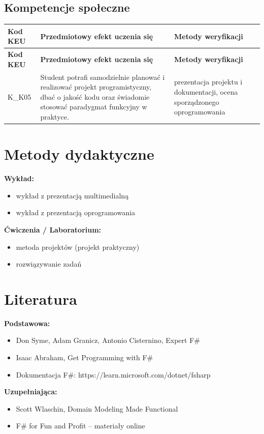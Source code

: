 \documentclass[12pt, a4paper]{article}
\newcommand{\thdrule}{\noalign{\global\setlength{\extrarowheight}{0pt}}}
\newcommand{\thdend}{\noalign{\global\setlength{\extrarowheight}{3pt}}}
\begin{document}
\subsection*{Kompetencje społeczne}
{\scriptsize
\begin{longtable}{m{1.6cm}m{9.0cm}m{4.2cm}}
\thdrule\toprule
\rowcolor{pjatkRed} {\color{white}\footnotesize\textbf{\vphantom{Ag}Kod KEU}} & {\color{white}\footnotesize\textbf{\vphantom{Ag}Przedmiotowy efekt uczenia się}} & {\color{white}\footnotesize\textbf{\vphantom{Ag}Metody weryfikacji}} \\
\midrule\thdend
\endfirsthead
\thdrule\toprule
\rowcolor{pjatkRed} {\color{white}\footnotesize\textbf{\vphantom{Ag}Kod KEU}} & {\color{white}\footnotesize\textbf{\vphantom{Ag}Przedmiotowy efekt uczenia się}} & {\color{white}\footnotesize\textbf{\vphantom{Ag}Metody weryfikacji}} \\
\midrule\thdend
\endhead
  \rowcolor{tableRowLight} K\_K05 & Student potrafi samodzielnie planować i realizować projekt programistyczny, dbać o jakość kodu oraz świadomie stosować paradygmat funkcyjny w praktyce. & prezentacja projektu i dokumentacji, ocena sporządzonego oprogramowania \\
\bottomrule
\end{longtable}}

\section{Metody dydaktyczne}

\textbf{Wykład:}
\begin{itemize}
  \item wykład z prezentacją multimedialną
  \item wykład z prezentacją oprogramowania
\end{itemize}
\vspace{4pt}
\textbf{Ćwiczenia / Laboratorium:}
\begin{itemize}
  \item metoda projektów (projekt praktyczny)
  \item rozwiązywanie zadań
\end{itemize}
\vspace{4pt}


\section{Literatura}

\textbf{Podstawowa:}
\begin{itemize}
  \item Don Syme, Adam Granicz, Antonio Cisternino, Expert F\#
  \item Isaac Abraham, Get Programming with F\#
  \item Dokumentacja F\#: https://learn.microsoft.com/dotnet/fsharp
\end{itemize}

\textbf{Uzupełniająca:}
\begin{itemize}
  \item Scott Wlaschin, Domain Modeling Made Functional
  \item F\# for Fun and Profit – materiały online
\end{itemize}
\end{document}
